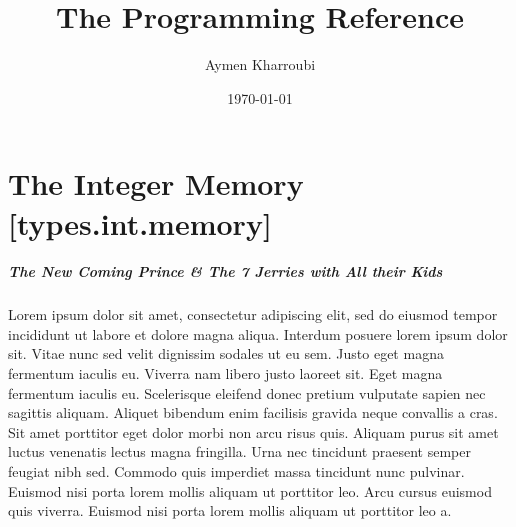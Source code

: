 \documentclass[a4paper, oneside, 10pt]{report}
\begin{document}



	\title      {The Programming Reference} %
	\author     {Aymen Kharroubi} %
	\date       {\today} %

	\maketitle %




	\tableofcontents %
	\clearpage





	\section [The Integer Memory] {The Integer Memory \hfill [types.int.memory]}


		\subparagraph [The New Coming Prince] {The New Coming Prince & The 7 Jerries with All their Kids}
				Lorem ipsum dolor sit amet, consectetur adipiscing elit, sed do eiusmod tempor incididunt ut labore et dolore magna aliqua. Interdum posuere lorem ipsum dolor sit. Vitae nunc sed velit dignissim sodales ut eu sem. Justo eget magna fermentum iaculis eu. Viverra nam libero justo laoreet sit. Eget magna fermentum iaculis eu. Scelerisque eleifend donec pretium vulputate sapien nec sagittis aliquam. Aliquet bibendum enim facilisis gravida neque convallis a cras. Sit amet porttitor eget dolor morbi non arcu risus quis. Aliquam purus sit amet luctus venenatis lectus magna fringilla. Urna nec tincidunt praesent semper feugiat nibh sed. Commodo quis imperdiet massa tincidunt nunc pulvinar. Euismod nisi porta lorem mollis aliquam ut porttitor leo. Arcu cursus euismod quis viverra. Euismod nisi porta lorem mollis aliquam ut porttitor leo a.
\end{document}
